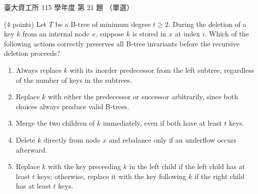 \begin{pastexam}[label={px:ntu-115-dsa-21}]{臺大資工所 115 學年度 第 21 題}
（單選）

(4 points) Let $T$ be a B-tree of minimum degree $t\ge 2$. During the deletion of a key $k$ from an internal node $x$, suppose $k$ is stored in $x$ at index $i$. Which of the following actions correctly preserves all B-tree invariants before the recursive deletion proceeds?
\begin{enumerate}[label=(\Alph*)]
\item Always replace $k$ with its inorder predecessor from the left subtree, regardless of the number of keys in the subtrees.
\item Replace $k$ with either the predecessor or successor arbitrarily, since both choices always produce valid B-trees.
\item Merge the two children of $k$ immediately, even if both have at least $t$ keys.
\item Delete $k$ directly from node $x$ and rebalance only if an underflow occurs afterward.
\item Replace $k$ with the key preceeding $k$ in the left child if the left child has at least $t$ keys; otherwise, replace it with the key following $k$ if the right child has at least $t$ keys.
\end{enumerate}
\end{pastexam}

